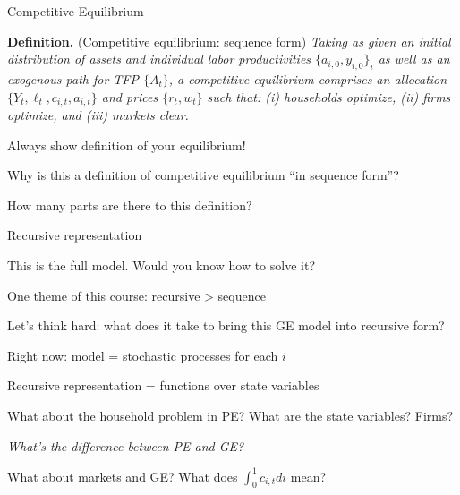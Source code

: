 \documentclass[11pt, aspectratio=169]{beamer}
\newenvironment{witemize}{\itemize\addtolength{\itemsep}{10pt}}{\enditemize}
\begin{document}
\begin{frame}{Competitive Equilibrium}

\vspace{6mm}
\noindent
\textbf{Definition.} (Competitive equilibrium: sequence form) 
\textit{
	Taking as given an initial distribution of assets and individual labor productivities $\{a_{i, 0}, y_{i, 0}\}_i$ as well as an exogenous path for TFP $\{A_t\}$, a competitive equilibrium comprises an allocation $\{Y_t, \ell_t, c_{i, t}, a_{i, t}\}$ and prices $\{r_t, w_t\}$ such that: (i) households optimize, (ii) firms optimize, and (iii) markets clear.
}

\pause
\vspace{8mm}
\begin{witemize}
\item Always show definition of your equilibrium!

\item Why is this a definition of competitive equilibrium ``in sequence form''?

\item How many parts are there to this definition?
\end{witemize}

\end{frame}


\begin{frame}{Recursive representation}
\begin{witemize}
\item This is the full model. Would you know how to solve it?

\pause
\item One theme of this course: recursive > sequence

\item Let's think hard: what does it take to bring this GE model into recursive form?

\pause
\item Right now: model = stochastic processes for each $i$

Recursive representation = functions over state variables

\item What about the household problem in PE? What are the state variables? Firms?

\vspace{1mm}
{\small \textit{What's the difference between PE and GE?}}

\pause
\item What about markets and GE? What does $\int_0^1 c_{i, t} di$ mean?

\end{witemize}
\end{frame}
\end{document}
